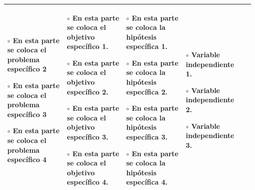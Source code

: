\begin{landscape}
\begin{tabular}{|p{3.8cm}|p{3.8cm}|p{3.8cm}|p{2.5cm}|p{3.5cm}|}
{    $\circ$ En esta parte se coloca el problema específico 2\vspace{0.1cm}

    $\circ$ En esta parte se coloca el problema específico 3\vspace{0.1cm}

    $\circ$ En esta parte se coloca el problema específico 4} &
    \multicolumn{1}{p{3.8cm}|}{
    $\circ$ En esta parte se coloca el objetivo específico 1.\vspace{0.1cm}

    $\circ$ En esta parte se coloca el objetivo específico 2.\vspace{0.1cm}

    $\circ$ En esta parte se coloca el objetivo específico 3.\vspace{0.1cm}

    $\circ$ En esta parte se coloca el objetivo específico 4.

    } & \multicolumn{1}{p{3.8cm}|}{
    $\circ$ En esta parte se coloca la hipótesis específica 1.\vspace{0.1cm}

    $\circ$ En esta parte se coloca la hipótesis específica 2.\vspace{0.1cm}

    $\circ$ En esta parte se coloca la hipótesis específica 3.\vspace{0.1cm}

    $\circ$ En esta parte se coloca la hipótesis específica 4.

    } & \multicolumn{1}{p{2.5cm}|}{
    \vspace{0.1cm}
    $\circ$ Variable independiente 1.\vspace{0.1cm}

    $\circ$ Variable independiente 2.\vspace{0.1cm}

    $\circ$ Variable independiente 3.
    }  & \\ \hline
\end{tabular}

\end{landscape}
\endgroup
